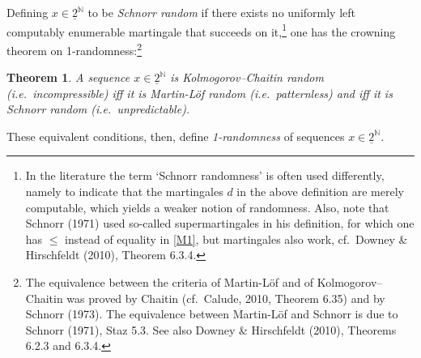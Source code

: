 \documentclass[12pt]{article}
\numberwithin{equation}{section}
\newcommand{\er}{\eqref}
\newcommand{\ul}{\underline}
\newcommand{\N}{{\mathbb N}} \newcommand{\R}{{\mathbb R}}
\newtheorem{theorem}[definition]{Theorem}
\begin{document}
Defining $x\in \ul{2}^{\N}$ to be \emph{Schnorr random} if there exists no uniformly left computably enumerable martingale that succeeds on it,\footnote{In the literature the term `Schnorr randomness' is often used differently, namely to indicate that the martingales $d$ in the above definition are merely computable, which yields a weaker notion of randomness. Also, note that Schnorr (1971) used so-called supermartingales in his definition, for which one has $\leq$ instead of equality in \er{M1}, but martingales also work, cf.\ Downey \& Hirschfeldt (2010), Theorem 6.3.4. 
} one has the crowning theorem on 1-randomness:\footnote{The equivalence between the criteria of Martin-L\"{o}f  and of 
Kolmogorov--Chaitin was proved by Chaitin (cf.\ Calude, 2010, Theorem 6.35) and by Schnorr (1973). The equivalence between  Martin-L\"{o}f  and Schnorr is due to Schnorr (1971), Staz 5.3. 
See also
 Downey \& Hirschfeldt (2010), Theorems 6.2.3 and 6.3.4.  }
 \begin{theorem}
 A  sequence $x\in \ul{2}^{\N}$ is Kolmogorov--Chaitin random (i.e.\ incompressible) 
  iff it is Martin-L\"{o}f random (i.e.\ patternless) and iff it is Schnorr random (i.e.\ unpredictable). 
   \end{theorem}
   These equivalent conditions, then, define \emph{1-randomness} of sequences $x\in \ul{2}^{\N}$.
\end{document}
